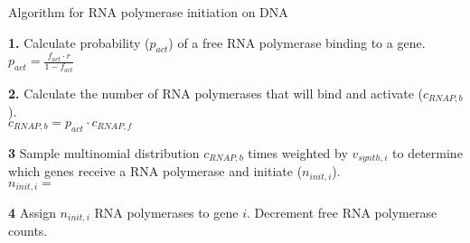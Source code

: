 \documentclass[12pt]{article}
\begin{document}
\begin{algorithm}[H]
\caption{Algorithm for RNA polymerase initiation on DNA}
\label{transcript_initiation_algorithm}
    
  \textbf{1.} Calculate probability ($p_{act}$) of a free RNA polymerase binding to a gene.\\
    \-\hspace{1cm} $p_{act} = \frac{f_{act} \cdot r}{1 - f_{act}}$
    
    \textbf{2.} Calculate the number of RNA polymerases that will bind and activate ($c_{RNAP,b}$).\\
    \-\hspace{1cm} $c_{RNAP,b} = p_{act} \cdot c_{RNAP,f}$
    
    \textbf{3} Sample multinomial distribution $c_{RNAP,b}$ times weighted by $v_{synth,i}$ to determine which genes receive a RNA polymerase and initiate ($n_{init,i}$).\\
    \-\hspace{1cm} $n_{init,i} =$ 
    
    \textbf{4} Assign $n_{init,i}$ RNA polymerases to gene $i$. Decrement free RNA polymerase counts.\\


\end{algorithm}
\newpage
\end{document}
